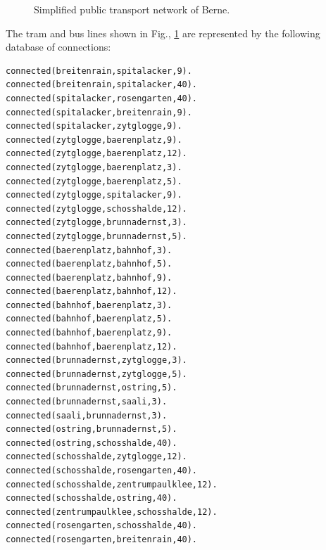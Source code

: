 \documentclass [11pt, a4wide, twoside]{article}
\begin{document}
\begin{figure}[h!]
  \caption{Simplified public transport network of Berne.}\label{tram}
\end{figure}

\noindent
The tram and bus lines shown in Fig., \ref{tram} are represented by the following database of connections:

\begin{small}
\begin{verbatim}
connected(breitenrain,spitalacker,9). 
connected(breitenrain,spitalacker,40). 
connected(spitalacker,rosengarten,40). 
connected(spitalacker,breitenrain,9). 
connected(spitalacker,zytglogge,9). 
connected(zytglogge,baerenplatz,9). 
connected(zytglogge,baerenplatz,12). 
connected(zytglogge,baerenplatz,3). 
connected(zytglogge,baerenplatz,5). 
connected(zytglogge,spitalacker,9). 
connected(zytglogge,schosshalde,12). 
connected(zytglogge,brunnadernst,3). 
connected(zytglogge,brunnadernst,5). 
connected(baerenplatz,bahnhof,3). 
connected(baerenplatz,bahnhof,5). 
connected(baerenplatz,bahnhof,9). 
connected(baerenplatz,bahnhof,12). 
connected(bahnhof,baerenplatz,3). 
connected(bahnhof,baerenplatz,5). 
connected(bahnhof,baerenplatz,9). 
connected(bahnhof,baerenplatz,12). 
connected(brunnadernst,zytglogge,3). 
connected(brunnadernst,zytglogge,5). 
connected(brunnadernst,ostring,5). 
connected(brunnadernst,saali,3). 
connected(saali,brunnadernst,3). 
connected(ostring,brunnadernst,5). 
connected(ostring,schosshalde,40). 
connected(schosshalde,zytglogge,12). 
connected(schosshalde,rosengarten,40). 
connected(schosshalde,zentrumpaulklee,12). 
connected(schosshalde,ostring,40). 
connected(zentrumpaulklee,schosshalde,12). 
connected(rosengarten,schosshalde,40). 
connected(rosengarten,breitenrain,40).
\end{verbatim}
\end{small}
\end{document}

